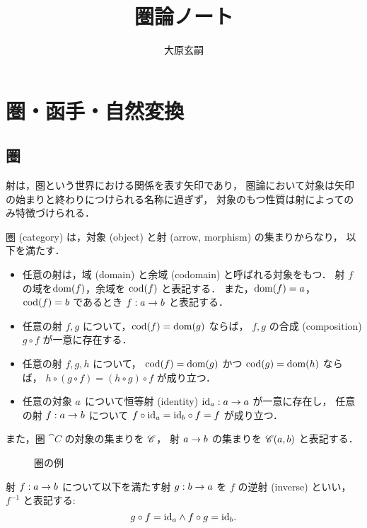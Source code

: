 \documentclass[titlepage]{ltjsreport}
\title{圏論ノート}
\author{大原玄嗣}
\newtheorem[S]{theorem}{定理}[chapter]
\newtheorem[S]{definition}[theorem]{定義}
\newtheorem[S]{example}[theorem]{例}
\begin{document}
\maketitle

\chapter{圏・函手・自然変換}

\section{圏}

射は，圏という世界における関係を表す矢印であり，
圏論において対象は矢印の始まりと終わりにつけられる名称に過ぎず，
対象のもつ性質は射によってのみ特徴づけられる．

\begin{definition}[圏]\label{def:category}
  \def\a{\obj{a}}%
  \def\b{\obj{b}}%
  圏 (category) は，対象 (object) と射 (arrow, morphism) の集まりからなり，
  以下を満たす．
  \begin{itemize}
    \item 任意の射は，域 (domain) と余域 (codomain) と呼ばれる対象をもつ．
          射 $f$ の域を$\operatorname{dom}(f)$，余域を $\operatorname{cod}(f)$ と表記する．
          また，$\dom(f)=\a$，$\cod(f)=\b$ であるとき
          $\mrp{f}{\a}{\b}$ と表記する．
    \item 任意の射 $f,g$ について，$\operatorname{cod}(f)=\operatorname{dom}(g)$ ならば，
          $f,g$ の合成 (composition) $g\circ f$ が一意に存在する．
    \item 任意の射 $f,g,h$ について，
          $\operatorname{cod}(f)=\operatorname{dom}(g)$ かつ $\operatorname{cod}(g)=\operatorname{dom}(h)$ ならば，
          $h\circ(g\circ f)=(h\circ g)\circ f$ が成り立つ．
    \item 任意の対象 $\a$ について恒等射 (identity)
          $\mrp{\id{\a}}{\a}{\a}$ が一意に存在し，
          任意の射 $\mrp{f}{\a}{\b}$ について
          $f\circ\id{\a}=\id{\b}\circ f=f$ が成り立つ．
  \end{itemize}
  また，圏 $\cat{C}$ の対象の集まりを $\mathscr{C}$，
  射 $\a\to\b$ の集まりを $\mrps{\cat{C}}{\a}{\b}$ と表記する．
\end{definition}

\begin{figure}[htbp]
  \centering
  
  \caption{圏の例}
\end{figure}

\begin{definition}[逆射]
  \def\a{\obj{a}}%
  \def\b{\obj{b}}%
  射 $\mrp{f}{\a}{\b}$ について以下を満たす射 $\mrp{g}{\b}{\a}$ を
  $f$ の逆射 (inverse) といい，
  $f^{-1}$ と表記する:
  \begin{equation}
    g\circ f=\id{\a}\wedge f\circ g=\id{\b}.
  \end{equation}
\end{definition}
\end{document}
